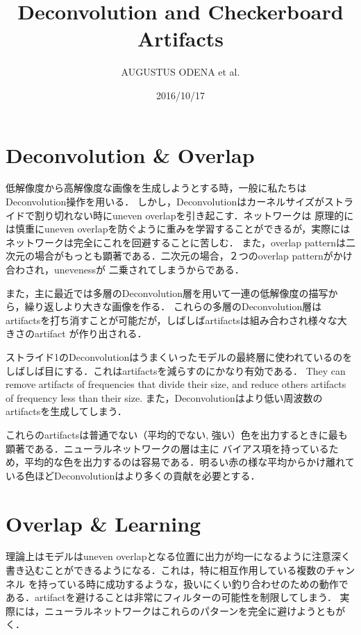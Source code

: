 \documentclass[uplatex, dvipdfmx]{jsarticle}
\title{Deconvolution and Checkerboard Artifacts}
\author{AUGUSTUS ODENA et al.}
\date{2016/10/17}
\theoremstyle{definition}
\begin{document}
    \maketitle
    \abovedisplayskip=10.0pt%
    \belowdisplayskip=10.0pt%
    \section{Deconvolution \& Overlap}
    低解像度から高解像度な画像を生成しようとする時，一般に私たちはDeconvolution操作を用いる．
    しかし，Deconvolutionはカーネルサイズがストライドで割り切れない時にuneven overlapを引き起こす．ネットワークは
    原理的には慎重にuneven overlapを防ぐように重みを学習することができるが，実際にはネットワークは完全にこれを回避することに苦しむ．
    また，overlap patternは二次元の場合がもっとも顕著である．二次元の場合，２つのoverlap patternがかけ合わされ，unevenessが
    二乗されてしまうからである．

    また，主に最近では多層のDeconvolution層を用いて一連の低解像度の描写から，繰り返しより大きな画像を作る．
    これらの多層のDeconvolution層はartifactsを打ち消すことが可能だが，しばしばartifactsは組み合わされ様々な大きさのartifact
    が作り出される．

    ストライド1のDeconvolutionはうまくいったモデルの最終層に使われているのをしばしば目にする．これはartifactsを減らすのにかなり有効である．
    They can remove artifacts of frequencies that divide their size, and reduce others artifacts of frequency less than their size.
    また，Deconvolutionはより低い周波数のartifactsを生成してしまう．
    
    これらのartifactsは普通でない（平均的でない, 強い）色を出力するときに最も顕著である．ニューラルネットワークの層は主に
    バイアス項を持っているため，平均的な色を出力するのは容易である．明るい赤の様な平均からかけ離れている色ほどDeconvolutionはより多くの貢献を必要とする．

    \section{Overlap \& Learning}
    理論上はモデルはuneven overlapとなる位置に出力が均一になるように注意深く書き込むことができるようになる．これは，特に相互作用している複数のチャンネル
    を持っている時に成功するような，扱いにくい釣り合わせのための動作である．artifactを避けることは非常にフィルターの可能性を制限してしまう．
    実際には，ニューラルネットワークはこれらのパターンを完全に避けようともがく．
\end{document}
